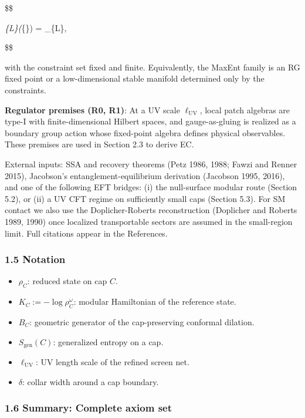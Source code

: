 \documentclass[11pt,a4paper]{article}
\theoremstyle{remark}
\providecommand{\tightlist}{%
  \setlength{\itemsep}{0pt}\setlength{\parskip}{0pt}}
\begin{document}
\$\$

\Phi\emph{\{\ell\to L\}(\omega}\{\ell\}) = \omega\_\{L\},

\$\$

with the constraint set fixed and finite. Equivalently, the MaxEnt family is
an RG fixed point or a low-dimensional stable manifold determined only by the
constraints.

\textbf{Regulator premises (R0, R1)}: At a UV scale \(\ell_{\mathrm{UV}}\), local patch algebras are
type-I with finite-dimensional Hilbert spaces, and gauge-as-gluing is realized
as a boundary group action whose fixed-point algebra defines physical
observables. These premises are used in Section 2.3 to derive EC.

External inputs: SSA and recovery theorems (Petz 1986, 1988; Fawzi and Renner
2015), Jacobson's entanglement-equilibrium derivation (Jacobson 1995, 2016),
and one of the following EFT bridges: (i) the null-surface modular route
(Section 5.2), or (ii) a UV CFT regime on sufficiently small caps (Section
5.3). For SM contact we also use the Doplicher-Roberts reconstruction
(Doplicher and Roberts 1989, 1990) once localized transportable sectors are
assumed in the small-region limit. Full citations appear in the References.

\subsubsection{1.5 Notation}\label{notation}

\begin{itemize}
\tightlist
\item
  \(\rho_C\): reduced state on cap \(C\).
\item
  \(K_C := -\log \rho_C^{\omega}\): modular Hamiltonian of the reference state.
\item
  \(B_C\): geometric generator of the cap-preserving conformal dilation.
\item
  \(S_{\mathrm{gen}}(C)\): generalized entropy on a cap.
\item
  \(\ell_{\mathrm{UV}}\): UV length scale of the refined screen net.
\item
  \(\delta\): collar width around a cap boundary.
\end{itemize}

\subsubsection{1.6 Summary: Complete axiom set}\label{summary-complete-axiom-set}
\end{document}
